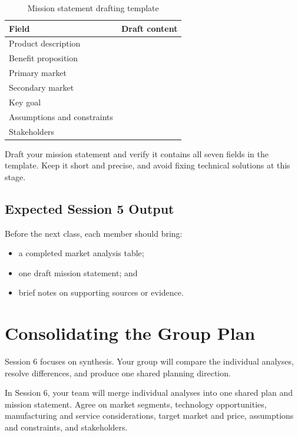 \begin{table}[htbp]
\centering
\caption{Mission statement drafting template}
\label{tab:session56-mission-template}
\renewcommand{\arraystretch}{1.2}
\begin{tabularx}{\textwidth}{|>{\raggedright\arraybackslash}p{}|X|}
\hline
\textbf{Field} & \textbf{Draft content} \\
\hline
Product description &  \\
\hline
Benefit proposition &  \\
\hline
Primary market &  \\
\hline
Secondary market &  \\
\hline
Key goal &  \\
\hline
Assumptions and constraints &  \\
\hline
Stakeholders &  \\
\hline
\end{tabularx}
\end{table}

\begin{tcolorbox}[title=Checkpoint]
Draft your mission statement and verify it contains all seven fields in the template. Keep it short and precise, and avoid fixing technical solutions at this stage.
\end{tcolorbox}

\subsection{Expected Session 5 Output}

Before the next class, each member should bring:
\begin{itemize}
    \item a completed market analysis table;
    \item one draft mission statement; and
    \item brief notes on supporting sources or evidence.
\end{itemize}

\section{Consolidating the Group Plan}

Session 6 focuses on synthesis. Your group will compare the individual analyses, resolve differences, and produce one shared planning direction.

\begin{tcolorbox}[title=Goal]
In Session 6, your team will merge individual analyses into one shared plan and mission statement. Agree on market segments, technology opportunities, manufacturing and service considerations, target market and price, assumptions and constraints, and stakeholders.
\end{tcolorbox}

